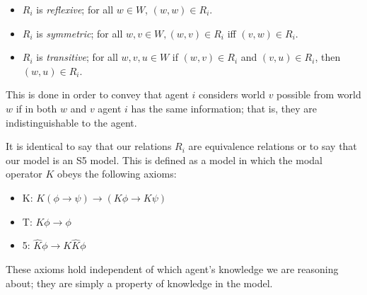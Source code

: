 \documentclass[10pt, a4paper]{report}
\begin{document}
\begin{itemize}
\item $R_i$ is \emph{reflexive}; for all $w \in W$, $(w, w) \in R_i$.
\item $R_i$ is \emph{symmetric}; for all $w, v \in W, (w, v) \in R_i$ iff $(v,
  w) \in R_i$.
\item $R_i$ is \emph{transitive}; for all $w, v, u \in W$ if $(w, v) \in R_i$
  and $(v, u) \in R_i$, then $(w, u) \in R_i$.
\end{itemize}

This is done in order to convey that agent $i$ considers world $v$ possible from
world $w$ if in both $w$ and $v$ agent $i$ has the same information; that is,
they are indistinguishable to the agent.

It is identical to say that our relations $R_i$ are equivalence relations or to
say that our model is an \textsf{S5} model. This is defined as a model in which
the modal operator $K$ obeys the following axioms:

\begin{itemize}
\item \textsf{K}: $K (\phi \rightarrow \psi) \rightarrow (K \phi \rightarrow K
  \psi)$
\item \textsf{T}: $K \phi \rightarrow \phi$
\item \textsf{5}: $\widehat K \phi \rightarrow K \widehat K \phi$
\end{itemize}

These axioms hold independent of which agent's knowledge we are reasoning about;
they are simply a property of knowledge in the model. 

\begin{figure}[h]
  \centering
  \caption{}
  \label{fig:EgS5}
\end{figure}
\end{document}
